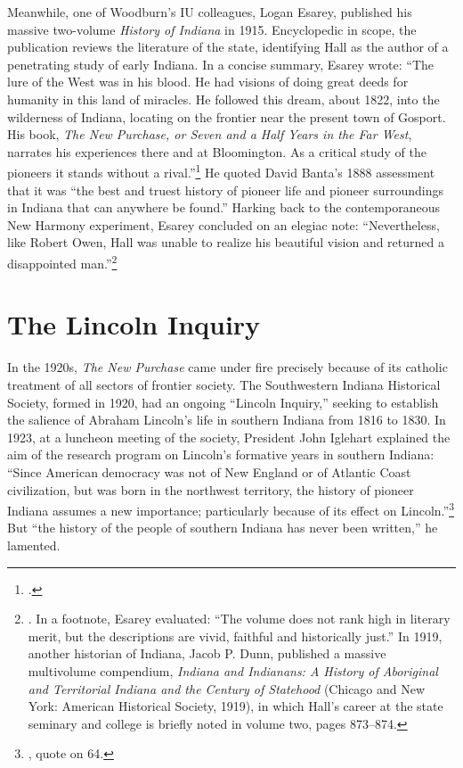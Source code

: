 \documentclass[
  american,
  letterpaper,
]{scrreprt}
\begin{document}
Meanwhile, one of Woodburn's IU colleagues, Logan Esarey, published his
massive two-volume \emph{History of Indiana} in 1915. Encyclopedic in
scope, the publication reviews the literature of the state, identifying
Hall as the author of a penetrating study of early Indiana. In a concise
summary, Esarey wrote: ``The lure of the West was in his blood. He had
visions of doing great deeds for humanity in this land of miracles. He
followed this dream, about 1822, into the wilderness of Indiana,
locating on the frontier near the present town of Gosport. His book,
\emph{The New Purchase, or Seven and a Half Years in the Far West},
narrates his experiences there and at Bloomington. As a critical study
of the pioneers it stands without a rival.''\footnote{.} He quoted David Banta's 1888 assessment that it was
``the best and truest history of pioneer life and pioneer surroundings
in Indiana that can anywhere be found.'' Harking back to the
contemporaneous New Harmony experiment, Esarey concluded on an elegiac
note: ``Nevertheless, like Robert Owen, Hall was unable to realize his
beautiful vision and returned a disappointed man.''\footnote{. In a footnote, Esarey evaluated: ``The
  volume does not rank high in literary merit, but the descriptions are
  vivid, faithful and historically just.'' In 1919, another historian of
  Indiana, Jacob P. Dunn, published a massive multivolume compendium,
  \emph{Indiana and Indianans: A History of Aboriginal and Territorial
  Indiana and the Century of Statehood} (Chicago and New York: American
  Historical Society, 1919), in which Hall's career at the state
  seminary and college is briefly noted in volume two, pages 873--874.}

\section{The Lincoln Inquiry}\label{the-lincoln-inquiry}

In the 1920s, \emph{The New Purchase} came under fire precisely because
of its catholic treatment of all sectors of frontier society. The
Southwestern Indiana Historical Society, formed in 1920, had an ongoing
``Lincoln Inquiry,'' seeking to establish the salience of Abraham
Lincoln's life in southern Indiana from 1816 to 1830. In 1923, at a
luncheon meeting of the society, President John Iglehart explained the
aim of the research program on Lincoln's formative years in southern
Indiana: ``Since American democracy was not of New England or of
Atlantic Coast civilization, but was born in the northwest territory,
the history of pioneer Indiana assumes a new importance; particularly
because of its effect on Lincoln.''\footnote{, quote on 64.}
But ``the history of the people of southern Indiana has never been
written,'' he lamented.
\end{document}

